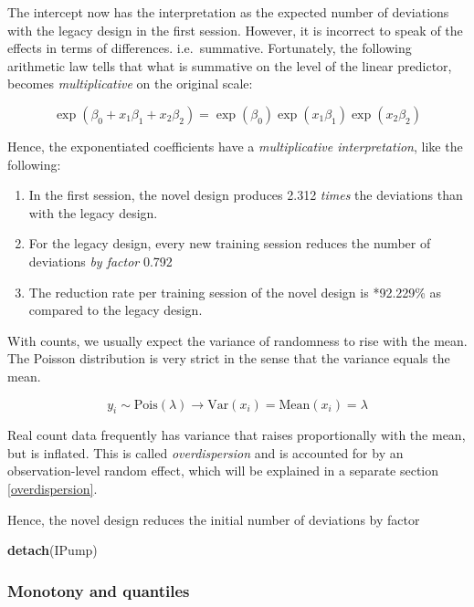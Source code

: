 \documentclass[]{svmono}
\newenvironment{Shaded}{\begin{snugshade}}{\end{snugshade}}
\newcommand{\KeywordTok}[1]{\textcolor[rgb]{0.13,0.29,0.53}{\textbf{#1}}}
\newcommand{\NormalTok}[1]{#1}
\providecommand{\tightlist}{%
  \setlength{\itemsep}{0pt}\setlength{\parskip}{0pt}}
\begin{document}
The intercept now has the interpretation as the expected number of
deviations with the legacy design in the first session. However, it is
incorrect to speak of the effects in terms of differences.
i.e.~summative. Fortunately, the following arithmetic law tells that
what is summative on the level of the linear predictor, becomes
\emph{multiplicative} on the original scale:

\[
\exp(\beta_0 + x_1\beta_1 + x_2\beta_2) =
\exp(\beta_0) \exp(x_1\beta_1) \exp(x_2\beta_2)
\]

Hence, the exponentiated coefficients have a \emph{multiplicative
interpretation}, like the following:

\begin{enumerate}
\def\labelenumi{\arabic{enumi}.}
\tightlist
\item
  In the first session, the novel design produces 2.312 \emph{times} the
  deviations than with the legacy design.
\item
  For the legacy design, every new training session reduces the number
  of deviations \emph{by factor} 0.792\\
\item
  The reduction rate per training session of the novel design is
  *92.229\% as compared to the legacy design.
\end{enumerate}

With counts, we usually expect the variance of randomness to rise with
the mean. The Poisson distribution is very strict in the sense that the
variance equals the mean.

\[
y_i \sim \textrm{Pois}(\lambda) \rightarrow \textrm{Var}(x_i) = \textrm{Mean}(x_i) = \lambda
\]

Real count data frequently has variance that raises proportionally with
the mean, but is inflated. This is called \emph{overdispersion} and is
accounted for by an observation-level random effect, which will be
explained in a separate section \ref{overdispersion}.

Hence, the novel design reduces the initial number of deviations by
factor

\begin{Shaded}
\begin{Highlighting}[]
\KeywordTok{detach}\NormalTok{(IPump)}
\end{Highlighting}
\end{Shaded}

\subsubsection{Monotony and quantiles}\label{monotony-and-quantiles}
\end{document}
